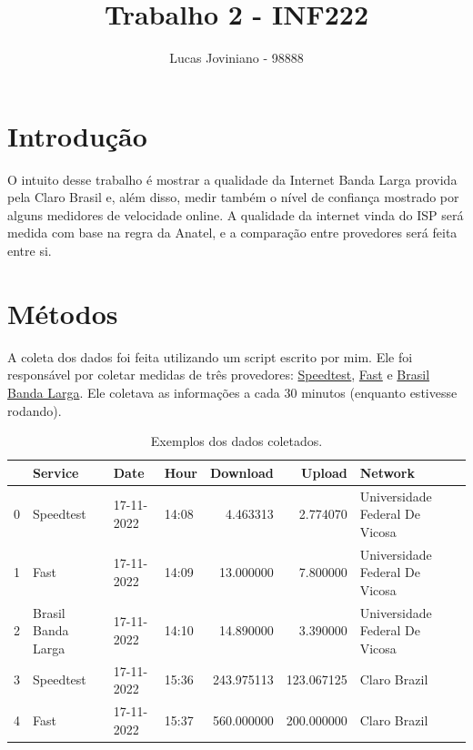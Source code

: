 \documentclass{report}
\title{\Huge{Trabalho 2 - INF222}}
\author{\huge{Lucas Joviniano - 98888}}
\begin{document}
\maketitle
\newpage%
\newpage
\section{Introdução}

O intuito desse trabalho é mostrar a qualidade da Internet Banda Larga provida pela Claro Brasil e, além disso, medir também o nível de confiança mostrado por alguns medidores de velocidade online. A qualidade da internet vinda do ISP será medida com base na regra da Anatel, e a comparação entre provedores será feita entre si.

\section{Métodos}

A coleta dos dados foi feita utilizando um script escrito por mim. Ele foi responsável por coletar medidas de três provedores: \href{https://www.speedtest.net/}{Speedtest}, \href{https://fast.com/pt/}{Fast} e \href{https://www.brasilbandalarga.com.br/}{Brasil Banda Larga}. Ele coletava as informações a cada 30 minutos (enquanto estivesse rodando).

\begin{table}[!h]
    \begin{center}
        \caption{Exemplos dos dados coletados.}
        \begin{tabular}{llllrrl}
            \toprule
            {} &             Service &        Date &   Hour &    Download &      Upload &                         Network \\
            \midrule
            0 &           Speedtest &  17-11-2022 &  14:08 &    4.463313 &    2.774070 &  Universidade Federal De Vicosa \\
            1 &                Fast &  17-11-2022 &  14:09 &   13.000000 &    7.800000 &  Universidade Federal De Vicosa \\
            2 &  Brasil Banda Larga &  17-11-2022 &  14:10 &   14.890000 &    3.390000 &  Universidade Federal De Vicosa \\
            3 &           Speedtest &  17-11-2022 &  15:36 &  243.975113 &  123.067125 &                    Claro Brazil \\
            4 &                Fast &  17-11-2022 &  15:37 &  560.000000 &  200.000000 &                    Claro Brazil \\
            \bottomrule
        \end{tabular}
    \end{center}
\end{table}
\end{document}
